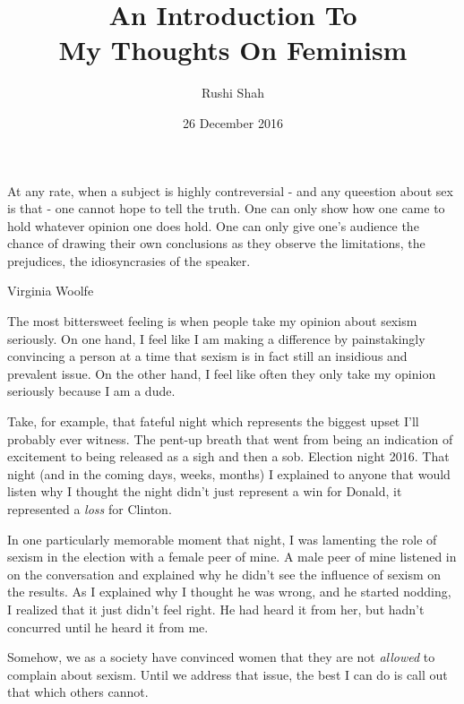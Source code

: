 \documentclass{article}
\author{Rushi Shah}
\date{26 December 2016}
\title{An Introduction To \\ My Thoughts On Feminism}
\begin{document}
\maketitle

	\epigraph{At any rate, when a subject is highly contreversial - and any queestion about sex is that - one cannot hope to tell the truth. One can only show how one came to hold whatever opinion one does hold. One can only give one's audience the chance of drawing their own conclusions as they observe the limitations, the prejudices, the idiosyncrasies of the speaker.}{Virginia Woolfe}

	The most bittersweet feeling is when people take my opinion about sexism seriously. On one hand, I feel like I am making a difference by painstakingly convincing a person at a time that sexism is in fact still an insidious and prevalent issue. On the other hand, I feel like often they only take my opinion seriously because I am a dude. 

	Take, for example, that fateful night which represents the biggest upset I'll probably ever witness. The pent-up breath that went from being an indication of excitement to being released as a sigh and then a sob. Election night 2016. That night (and in the coming days, weeks, months) I explained to anyone that would listen why I thought the night didn't just represent a win for Donald, it represented a \textit{loss} for Clinton. 

	In one particularly memorable moment that night, I was lamenting the role of sexism in the election with a female peer of mine. A male peer of mine listened in on the conversation and explained why he didn't see the influence of sexism on the results. As I explained why I thought he was wrong, and he started nodding, I realized that it just didn't feel right. He had heard it from her, but hadn't concurred until he heard it from me. 

	Somehow, we as a society have convinced women that they are not \textit{allowed} to complain about sexism. Until we address that issue, the best I can do is call out that which others cannot. 



\end{document}
